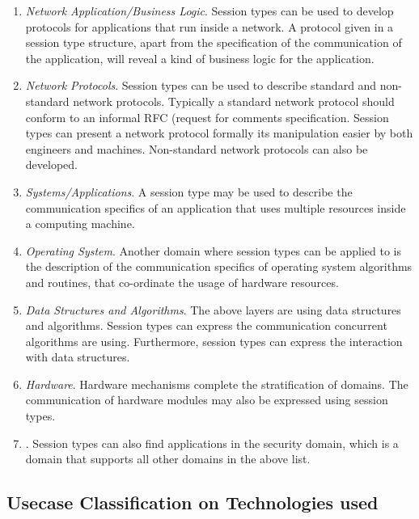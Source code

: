 \begin{enumerate}
	\item	{\em Network Application/Business Logic}.
			Session types can be used to develop protocols for applications
			that run inside a network.
			A protocol given in a session type structure, apart from the
			specification of the communication of the application, will
			reveal a kind of business logic for the application.

	\item	{\em Network Protocols}.
			Session types can be used to describe standard and non-standard network protocols.
			Typically a standard network protocol should conform to
			an informal RFC (request for comments specification. Session types
			can present a network protocol formally its manipulation easier
			by both engineers and machines.
			Non-standard network protocols can also be developed.


	\item	{\em Systems/Applications}.
			A session type may be used to describe the communication
			specifics of an application that uses multiple resources
			inside a computing machine.

	\item	{\em Operating System}.
			Another domain where session types can be applied to
			is the description of the communication specifics
			of operating system algorithms and routines, that
			co-ordinate the usage of hardware resources.

	\item	{\em Data Structures and Algorithms}.
			The above layers are using data structures and algorithms.
			Session types can express the communication
			concurrent algorithms are using. Furthermore, session types
			can express the interaction with data structures.

	\item	{\em Hardware}.
			Hardware mechanisms complete the stratification of domains.
			The communication of hardware modules may also be expressed
			using session types.

	\item	{}.
			Session types can also find applications in the security domain,
			which is a domain that supports all other domains in the above list.
\end{enumerate}


\subsection{Usecase Classification on Technologies used}

